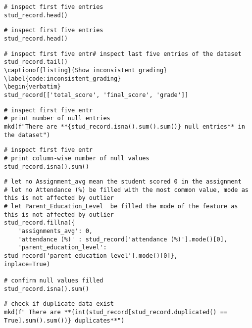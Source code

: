 \label{code:data_head}
\begin{verbatim}
# inspect first five entries 
stud_record.head()
\end{verbatim}

\label{code:dataset_head}
\begin{verbatim}
# inspect first five entries 
stud_record.head()
\end{verbatim}


\label{code:dataset_tail}
\begin{verbatim}
# inspect first five entr# inspect last five entries of the dataset
stud_record.tail()
\captionof{listing}{Show inconsistent grading}
\label{code:inconsistent_grading}
\begin{verbatim}
stud_record[['total_score', 'final_score', 'grade']]
\end{verbatim}

\label{code:total_null_values}
\begin{verbatim}
# inspect first five entr
# print number of null entries
mkd(f"There are **{stud_record.isna().sum().sum()} null entries** in the dataset")
\end{verbatim}


\label{code:dataset_null}
\begin{verbatim}
# inspect first five entr
# print column-wise number of null values
stud_record.isna().sum()
\end{verbatim}

\label{code:fill_null}
\begin{verbatim}
# let no Assignment_avg mean the student scored 0 in the assignment
# let no Attendance (%) be filled with the most common value, mode as this is not affected by outlier
# let Parent_Education_Level  be filled the mode of the feature as this is not affected by outlier
stud_record.fillna({
	'assignments_avg': 0, 
	'attendance (%)' : stud_record['attendance (%)'].mode()[0],
	'parent_education_level': stud_record['parent_education_level'].mode()[0]},
inplace=True)

# confirm null values filled
stud_record.isna().sum()
\end{verbatim}


\label{code:duplicates}
\begin{verbatim}
# check if duplicate data exist
mkd(f" There are **{int(stud_record[stud_record.duplicated() == True].sum().sum())} duplicates**")
\end{verbatim}


